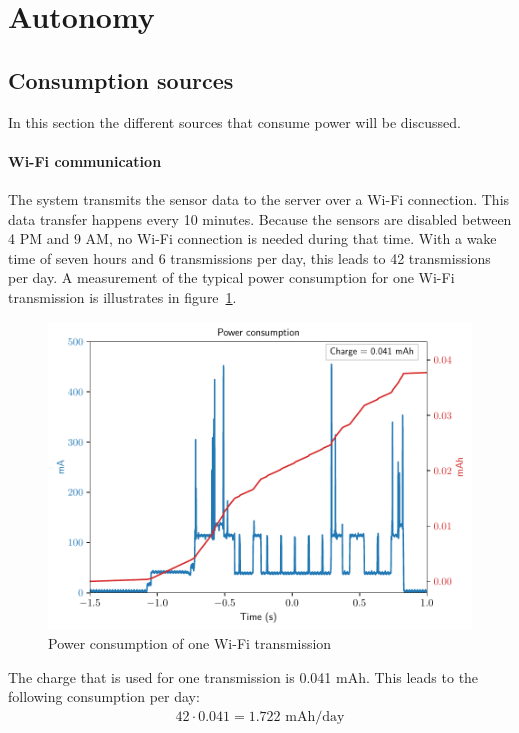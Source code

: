 \documentclass[11pt,a4paper]{article}
\begin{document}
\section{Autonomy}

\subsection{Consumption sources}
In this section the different sources that consume power will be discussed.

\paragraph{Wi-Fi communication}
The system transmits the sensor data to the server over a Wi-Fi connection. This data transfer happens every 10 minutes. Because the sensors are disabled between 4 PM and 9 AM, no Wi-Fi connection is needed during that time. With a wake time of seven hours and 6 transmissions per day, this leads to 42 transmissions per day. A measurement of the typical power consumption for one Wi-Fi transmission is illustrates in figure~\ref{fig:wifipwr}.
\begin{figure}[!ht]
	\centering
	\includegraphics[width=1.0\linewidth]{wifi_pwr.pdf}
	\caption{Power consumption of one Wi-Fi transmission}
	\label{fig:wifipwr}
\end{figure}
The charge that is used for one transmission is 0.041 mAh. This leads to the following consumption per day:
\begin{gather*}
42 \cdot 0.041 = 1.722 \text{ mAh/day}
\end{gather*}
\end{document}
